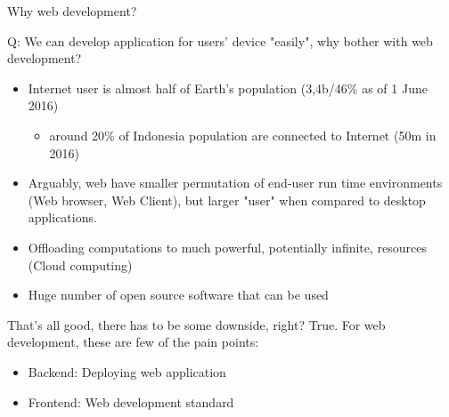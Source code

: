 \documentclass{beamer}
\begin{document}
  
  \begin{frame}{Why web development?}

	Q: We can develop application for users' device "easily", why bother with web development?

	\pause
	\begin{itemize}[<+->]
	
		\item Internet user is almost half of Earth's population (3,4b/46\% as of 1 June 2016)\footnotemark[1]
			\begin{itemize}[<+->]
				\item around 20\% of Indonesia population are connected to Internet (50m in 2016\footnotemark[1])
			\end{itemize}
			
		\item Arguably, web have smaller permutation of end-user run time environments (Web browser, Web Client), but larger "user" when compared to desktop applications.
		
		\item Offloading computations to much powerful, potentially infinite, resources (Cloud computing)
		
		\item Huge number of open source software that can be used
		
	\end{itemize}

  \end{frame}
  
  \begin{frame}{That's all good, there has to be some downside, right?}
  	\pause
	True. For web development, these are few of the pain points:
	\pause
	\begin{itemize}[<+->]
		\item Backend: Deploying web application
		\item Frontend: Web development standard
  	\end{itemize}
  \end{frame}
  
\end{document}
